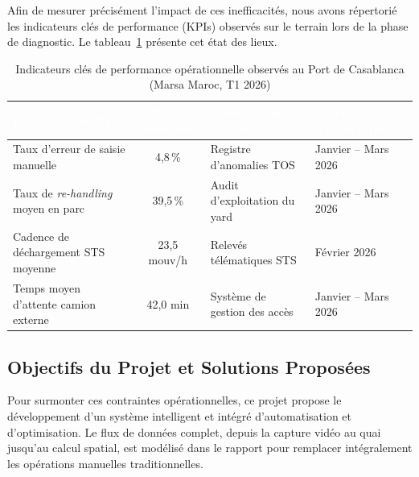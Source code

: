 \documentclass[12pt,a4paper]{article}
\begin{document}
Afin de mesurer précisément l'impact de ces inefficacités, nous avons répertorié les indicateurs clés de performance (KPIs) observés sur le terrain lors de la phase de diagnostic. Le tableau~\ref{tab:baseline_metrics} présente cet état des lieux.

\begin{table}[H]
\centering
\caption{Indicateurs clés de performance opérationnelle observés au Port de Casablanca (Marsa Maroc, T1 2026)}
\begin{tabular}{|p{5.5cm}|c|p{4.5cm}|p{3.5cm}|}
\hline
\rowcolor{TableHeader}\textcolor{white}{\textbf{Indicateur (KPI)}} & \textcolor{white}{\textbf{Valeur observée}} & \textcolor{white}{\textbf{Source de la donnée}} & \textcolor{white}{\textbf{Période d'observation}} \\ \hline
Taux d'erreur de saisie manuelle & 4,8\,\% & Registre d'anomalies TOS & Janvier -- Mars 2026 \\ \hline
Taux de \textit{re-handling} moyen en parc & 39,5\,\% & Audit d'exploitation du yard & Janvier -- Mars 2026 \\ \hline
Cadence de déchargement STS moyenne & 23,5 mouv/h & Relevés télématiques STS & Février 2026 \\ \hline
Temps moyen d'attente camion externe & 42,0 min & Système de gestion des accès & Janvier -- Mars 2026 \\ \hline
\end{tabular}
\label{tab:baseline_metrics}
\end{table}

\subsection{Objectifs du Projet et Solutions Proposées}

Pour surmonter ces contraintes opérationnelles, ce projet propose le développement d'un système intelligent et intégré d'automatisation et d'optimisation. Le flux de données complet, depuis la capture vidéo au quai jusqu'au calcul spatial, est modélisé dans le rapport pour remplacer intégralement les opérations manuelles traditionnelles.
\end{document}
